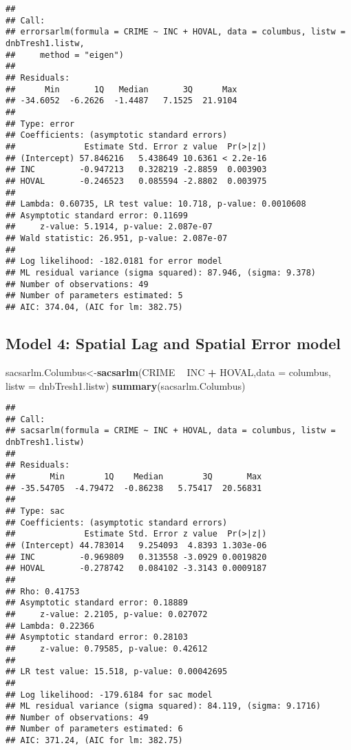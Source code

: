 \documentclass[
]{book}
\newenvironment{Shaded}{\begin{snugshade}}{\end{snugshade}}
\newcommand{\DataTypeTok}[1]{\textcolor[rgb]{0.13,0.29,0.53}{#1}}
\newcommand{\KeywordTok}[1]{\textcolor[rgb]{0.13,0.29,0.53}{\textbf{#1}}}
\newcommand{\NormalTok}[1]{#1}
\newcommand{\OperatorTok}[1]{\textcolor[rgb]{0.81,0.36,0.00}{\textbf{#1}}}
\newcommand{\StringTok}[1]{\textcolor[rgb]{0.31,0.60,0.02}{#1}}
\begin{document}
\begin{verbatim}
## 
## Call:
## errorsarlm(formula = CRIME ~ INC + HOVAL, data = columbus, listw = dnbTresh1.listw, 
##     method = "eigen")
## 
## Residuals:
##      Min       1Q   Median       3Q      Max 
## -34.6052  -6.2626  -1.4487   7.1525  21.9104 
## 
## Type: error 
## Coefficients: (asymptotic standard errors) 
##              Estimate Std. Error z value  Pr(>|z|)
## (Intercept) 57.846216   5.438649 10.6361 < 2.2e-16
## INC         -0.947213   0.328219 -2.8859  0.003903
## HOVAL       -0.246523   0.085594 -2.8802  0.003975
## 
## Lambda: 0.60735, LR test value: 10.718, p-value: 0.0010608
## Asymptotic standard error: 0.11699
##     z-value: 5.1914, p-value: 2.087e-07
## Wald statistic: 26.951, p-value: 2.087e-07
## 
## Log likelihood: -182.0181 for error model
## ML residual variance (sigma squared): 87.946, (sigma: 9.378)
## Number of observations: 49 
## Number of parameters estimated: 5 
## AIC: 374.04, (AIC for lm: 382.75)
\end{verbatim}

\hypertarget{model-4-spatial-lag-and-spatial-error-model}{%
\subsection{Model 4: Spatial Lag and Spatial Error model}\label{model-4-spatial-lag-and-spatial-error-model}}

\begin{Shaded}
\begin{Highlighting}[]
\NormalTok{sacsarlm.Columbus<-}\KeywordTok{sacsarlm}\NormalTok{(CRIME }\OperatorTok{~}\StringTok{ }\NormalTok{INC }\OperatorTok{+}\StringTok{ }\NormalTok{HOVAL,}\DataTypeTok{data =}\NormalTok{ columbus,}
                           \DataTypeTok{listw =}\NormalTok{ dnbTresh1.listw)}
\KeywordTok{summary}\NormalTok{(sacsarlm.Columbus)}
\end{Highlighting}
\end{Shaded}

\begin{verbatim}
## 
## Call:
## sacsarlm(formula = CRIME ~ INC + HOVAL, data = columbus, listw = dnbTresh1.listw)
## 
## Residuals:
##       Min        1Q    Median        3Q       Max 
## -35.54705  -4.79472  -0.86238   5.75417  20.56831 
## 
## Type: sac 
## Coefficients: (asymptotic standard errors) 
##              Estimate Std. Error z value  Pr(>|z|)
## (Intercept) 44.783014   9.254093  4.8393 1.303e-06
## INC         -0.969809   0.313558 -3.0929 0.0019820
## HOVAL       -0.278742   0.084102 -3.3143 0.0009187
## 
## Rho: 0.41753
## Asymptotic standard error: 0.18889
##     z-value: 2.2105, p-value: 0.027072
## Lambda: 0.22366
## Asymptotic standard error: 0.28103
##     z-value: 0.79585, p-value: 0.42612
## 
## LR test value: 15.518, p-value: 0.00042695
## 
## Log likelihood: -179.6184 for sac model
## ML residual variance (sigma squared): 84.119, (sigma: 9.1716)
## Number of observations: 49 
## Number of parameters estimated: 6 
## AIC: 371.24, (AIC for lm: 382.75)
\end{verbatim}

  
\end{document}
